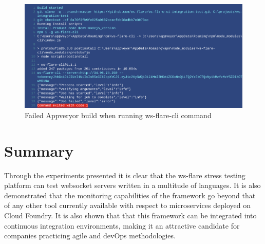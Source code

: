 \begin{figure}[H]
  \centering
    \includegraphics[width=1\textwidth]{figures/experiments/experiment-3/appveyor-output-failed.png}
    \caption{Failed Appveryor build when running ws-flare-cli command}
    \label{fig:experiment-3-appveyor-log-failed}
\end{figure}

\section{Summary}

Through the experiments presented it is clear that the ws-flare stress testing platform can test websocket servers written in a multitude of languages. It is also demonstrated that the monitoring capabilities of the framework go beyond that of any other tool currently available with respect to microservices deployed on Cloud Foundry. It is also shown that that this framework can be integrated into continuous integration environments, making it an attractive candidate for companies practicing agile and devOps methodologies.